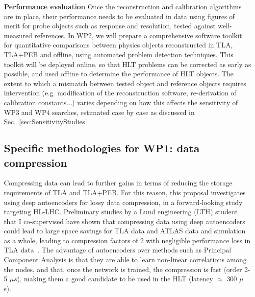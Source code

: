 \textbf{Performance evaluation} Once the reconstruction and calibration algorithms are in place, their performance needs to be evaluated in data using figures of merit for probe objects such as response and resolution, tested against well-measured references. 
In WP2, we will prepare a comprehensive software toolkit for quantitative comparisons between physics objects reconstructed in TLA, TLA+PEB and offline, using automated problem detection techniques. 
This toolkit will be deployed online, so that HLT problems can be corrected as early as possible, and used offline to determine the performance of HLT objects.  
The extent to which a mismatch between tested object and reference objects requires intervention (e.g. modification of the reconstruction software, re-derivation of calibration constants...) varies depending on how this affects the sensitivity of WP3 and WP4 searches, estimated case by case as discussed in Sec.~\ref{sec:SensitivityStudies}.
 
\subsection{Specific methodologies for WP1: data compression}
\label{sub:SpecificMethodsCompression}

Compressing data can lead to further gains in terms of reducing the storage requirements of TLA and TLA+PEB. 
For this reason, this proposal investigates using deep autoencoders for lossy data compression, in a forward-looking study targeting HL-LHC. 
Preliminary studies by a Lund engineering (LTH) student that I co-supervised have shown that compressing data using deep autoencoders could lead to large space savings for TLA data and ATLAS data and simulation as a whole, leading to compression factors of 2 with negligible performance loss in TLA data~\cite{ToBeCited}. %
The advantage of autoencoders over methods such as Principal Component Analysis is that they are able to learn non-linear correlations among the nodes, 
and that, once the network is trained, the compression is fast (order 2-5 $\mu s$), making them a good candidate to be used in the HLT (latency $\approx$ 300 $\mu$ s). 


